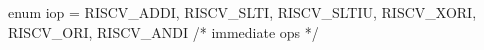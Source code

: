 enum iop = {RISCV_ADDI, RISCV_SLTI, RISCV_SLTIU,
            RISCV_XORI, RISCV_ORI, RISCV_ANDI}    /* immediate ops */
